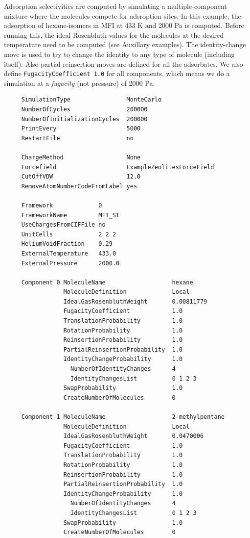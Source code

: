 Adsorption selectivities are computed by simulating a multiple-component mixture where the molecules compete for adsroption sites.
In this example, the adsorption of hexane-isomers in MFI at 433 K and 2000 Pa is computed.
Before running this, the ideal Rosenbluth values for the molecules at the desired temperature need to be computed (see Auxillary examples).
The identity-change move is used to try to change the identity to any type of molecule (including itself).
Also partial-reinsertion moves are defined for all the adsorbates.
We also define \verb+FugacityCoefficient 1.0+ for all components, which means we do a simulation at a \emph{fugacity} (not pressure) of 2000 Pa.
\begin{tiny}
\begin{verbatim}
     SimulationType                MonteCarlo
     NumberOfCycles                200000
     NumberOfInitializationCycles  200000
     PrintEvery                    5000
     RestartFile                   no
     
     ChargeMethod                  None
     Forcefield                    ExampleZeolitesForceField
     CutOffVDW                     12.0
     RemoveAtomNumberCodeFromLabel yes
     
     Framework             0
     FrameworkName         MFI_SI
     UseChargesFromCIFFile no
     UnitCells             2 2 2
     HeliumVoidFraction    0.29
     ExternalTemperature   433.0
     ExternalPressure      2000.0
     
     Component 0 MoleculeName                   hexane
                 MoleculeDefinition             Local
                 IdealGasRosenbluthWeight       0.00811779
                 FugacityCoefficient            1.0
                 TranslationProbability         1.0
                 RotationProbability            1.0
                 ReinsertionProbability         1.0
                 PartialReinsertionProbability  1.0
                 IdentityChangeProbability      1.0
                   NumberOfIdentityChanges      4
                   IdentityChangesList          0 1 2 3
                 SwapProbability                1.0
                 CreateNumberOfMolecules        0
     
     Component 1 MoleculeName                   2-methylpentane
                 MoleculeDefinition             Local
                 IdealGasRosenbluthWeight       0.0470006
                 FugacityCoefficient            1.0
                 TranslationProbability         1.0
                 RotationProbability            1.0
                 ReinsertionProbability         1.0
                 PartialReinsertionProbability  1.0
                 IdentityChangeProbability      1.0
                   NumberOfIdentityChanges      4
                   IdentityChangesList          0 1 2 3
                 SwapProbability                1.0
                 CreateNumberOfMolecules        0
     

\end{verbatim}
\end{tiny}
